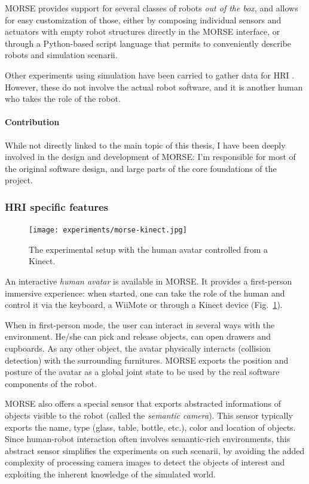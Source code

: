 MORSE provides support for several classes of robots \textit{out of the box}, and
allows for easy customization of those, either by composing individual sensors
and actuators with empty robot structures directly in the MORSE interface, or
through a Python-based script language that permits to conveniently describe
robots and simulation scenarii.

Other experiments using simulation have been carried to gather data for HRI
\cite{Chernova2011}. However, these do not involve the actual robot software,
and it is another human who takes the role of the robot.

\paragraph{Contribution} While not directly linked to the main topic of this
thesis, I have been deeply involved in the design and development of MORSE: I'm
responsible for most of the original software design, and large parts of the
core foundations of the project.

\subsubsection{HRI specific features}
\label{sect|morse-hri}

\begin{figure}[t]
      \centering
      \texttt{[image: experiments/morse-kinect.jpg]}
      \caption{The experimental setup with the human avatar controlled from a
      Kinect.}
      \label{fig|kinect-setup}
\end{figure}

An interactive \emph{human avatar} is available in MORSE. It provides a
first-person immersive experience: when started, one can take the role of the
human and control it via the keyboard, a WiiMote or through a Kinect device
(Fig.~\ref{fig|kinect-setup}).

When in first-person mode, the user can interact in several ways with the
environment. He/she can pick and release objects, can open drawers and
cupboards. As any other object, the avatar physically interacts (collision
detection) with the surrounding furnitures.  MORSE exports the position
and posture of the avatar as a global joint state to be used by the real
software components of the robot.

MORSE also offers a special sensor that exports abstracted informations of
objects visible to the robot (called the \emph{semantic camera}). This
sensor typically exports the name, type (glass, table, bottle, etc.), color and
location of objects. Since human-robot interaction often involves
semantic-rich environments, this abstract sensor simplifies the
experiments on such scenarii, by avoiding the added complexity of processing
camera images to detect the objects of interest and exploiting the inherent
knowledge of the simulated world.

